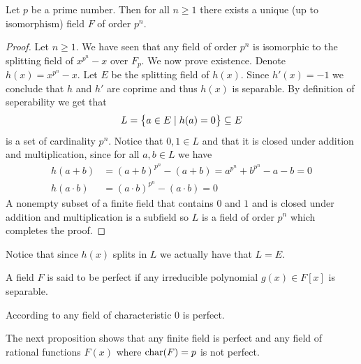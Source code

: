 \documentclass[11pt,a4paper]{article}
\begin{document}
\begin{proposition}
  Let $p$ be a prime number.
  Then for all $n \geq 1$ there exists a unique (up to isomorphism)
  field $F$ of order $p^n$.
\end{proposition}
\begin{proof}
  Let $n \geq 1$.
  We have seen that any field of order $p^n$ is isomorphic
  to the splitting field of $x^{p^n} - x$ over $F_p$.
  We now prove existence.
  Denote $h(x) = x^{p^n} - x$.
  Let $E$ be the splitting field of $h(x)$.
  Since $h'(x) = -1$
  we conclude that $h$ and $h'$ are coprime and thus $h(x)$ is separable.
  By definition of seperability we get that
  \[
    L = \left\{a \in E \mid h(a) = 0\right\} \subseteq E
  \]
  is a set of cardinality $p^n$.
  Notice that $0,1 \in L$ and that
  it is closed under addition and multiplication,
  since for all $a,b \in L$ we have
  \begin{align*}
    h(a + b) &= (a + b)^{p^n} - (a + b) = a^{p^n} + b^{p^n} - a - b = 0 \\
    h(a \cdot b) &= (a \cdot b)^{p^n} - (a \cdot b) = 0
  \end{align*}
  A nonempty subset of a finite field that contains $0$ and $1$
  and is closed under addition and multiplication is a subfield
  so $L$ is a field of order $p^n$ which completes the proof.
\end{proof}

\begin{remark}
  Notice that since $h(x)$ splits in $L$
  we actually have that $L = E$.
\end{remark}

\begin{definition}
  A field $F$ is said to be perfect
  if any irreducible polynomial $g(x) \in F[x]$ is separable.
\end{definition}

\begin{example}
  According to 
  any field of characteristic $0$ is perfect.
\end{example}

\begin{remark}
  The next proposition shows that any finite field is perfect and 
  any field of rational functions $F(x)$ where $\text{char}(F) = p$
  is not perfect.
\end{remark}
\end{document}
